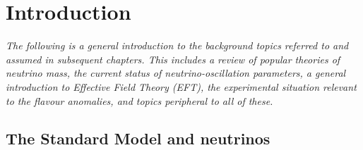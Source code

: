 \graphicspath{{img/chapter_1/}}

\chapter{Introduction}
\label{chapter:introduction}

\begin{flushleft}
  \textit{The following is a general introduction to the background topics
    referred to and assumed in subsequent chapters. This includes a review of
    popular theories of neutrino mass, the current status of
    neutrino-oscillation parameters, a general introduction to Effective Field
    Theory (EFT), the experimental situation relevant to the flavour anomalies,
    and topics peripheral to all of these.}
\end{flushleft}

\section{The Standard Model and neutrinos}

